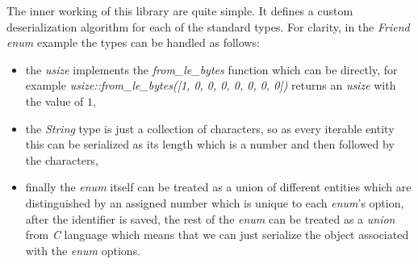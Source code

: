 The inner working of this library are quite simple. It defines a custom deserialization algorithm for each of the standard types. For clarity, in the \textit{Friend} \textit{enum} example the types can be handled as follows:
\begin{itemize}
    \item the \textit{usize} implements the \textit{from\_le\_bytes} function which can be directly, for example \textit{usize::from\_le\_bytes([1, 0, 0, 0, 0, 0, 0, 0])} returns an \textit{usize} with the value of $1$,
    \item the \textit{String} type is just a collection of characters, so as every iterable entity this can be serialized as its length which is a number and then followed by the characters,
    \item finally the \textit{enum} itself can be treated as a union of different entities which are distinguished by an assigned number which is unique to each \textit{enum}'s option, after the identifier is saved, the rest of the \textit{enum} can be treated as a \textit{union} from \textit{C} language which means that we can just serialize the object associated with the \textit{enum} options.
\end{itemize}

